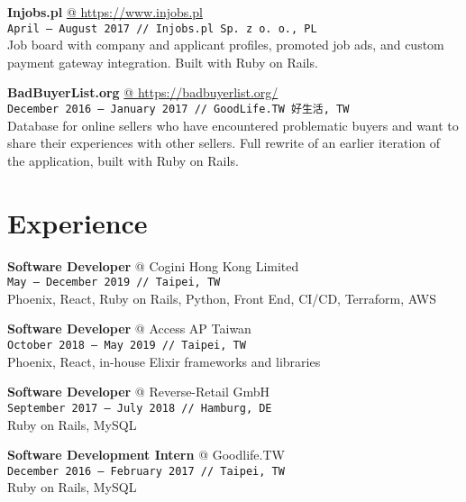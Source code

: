 \documentclass[10pt,a4paper]{article}
\makeatletter
\newcommand{\projectweb}[4]{\par\vspace{1em}\textbf{\normalsize #1} \href{#2}{\color{darkgray} @ #2}\\{\footnotesize\texttt{#3 // #4}}\\[4pt]}
\newcommand{\experience}[4]{\par\vspace{1em}\textbf{\normalsize #1} {\color{darkgray} @ #2}\\{\footnotesize\texttt{#3 // #4}}\\[4pt]}
\makeatother
\begin{document}
\begin{minipage}[t]{0.67\textwidth}
  \projectweb{Injobs.pl}{https://www.injobs.pl}{April {–} August 2017}{Injobs.pl Sp. z o. o., PL}

  \small
  Job board with company and applicant profiles, promoted job ads, and custom payment gateway integration. Built with Ruby on Rails.

  \projectweb{BadBuyerList.org}{https://badbuyerlist.org/}{December 2016 {–} January 2017}{GoodLife.TW 好生活, TW}

  \small
  Database for online sellers who have encountered problematic buyers and want to share their experiences with other sellers. Full rewrite of an earlier iteration of the application, built with Ruby on Rails.

  \vspace{1.2em}
  \section{Experience}
  \vspace*{-6pt}

  \experience{Software Developer}{Cogini Hong Kong Limited}{May {–} December 2019}{Taipei, TW}

  \small Phoenix, React, Ruby on Rails, Python, Front End, CI/CD, Terraform, AWS

  \experience{Software Developer}{Access AP Taiwan}{October 2018 {–} May 2019}{Taipei, TW}

  \small Phoenix, React, in-house Elixir frameworks and libraries

  \experience{Software Developer}{Reverse-Retail GmbH}{September 2017 {–} July 2018}{Hamburg, DE}

  \small Ruby on Rails, MySQL

  \experience{Software Development Intern}{Goodlife.TW}{December 2016 {–} February 2017}{Taipei, TW}

  \small Ruby on Rails, MySQL

\end{minipage}\hspace{0.03\textwidth}%
\end{document}
